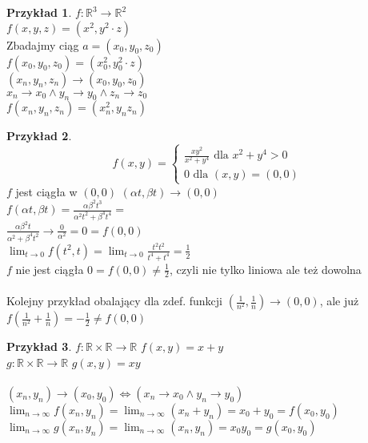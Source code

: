 \documentclass{article}
\theoremstyle{definition}
\theoremstyle{definition}
\theoremstyle{definition}
\newtheorem{pk}{Przykład}[subsection]
\theoremstyle{definition}
\begin{document}
\begin{pk}
    $f: \mathbb{R}^3 \rightarrow \mathbb{R}^2$\\
    $f(x,y,z) = (x^2,y^2\cdot z)$\\
    Zbadajmy ciąg $a=(x_0, y_0, z_0)$\\
    $f(x_0, y_0, z_0) = (x_0^2, y_0^2\cdot z)$\\
    $(x_n, y_n, z_n) \rightarrow (x_0, y_0, z_0)$\\
    $x_n\rightarrow x_0 \land y_n \rightarrow y_0 \land z_n \rightarrow z_0$\\
    $f(x_n,y_n,z_n) = (x_n^2, y_n z_n)$\\
\end{pk}

\begin{pk}
    $$f(x,y)=\begin{cases}
        \frac{xy^2}{x^2+y^4} \text{ dla } x^2 + y^4 > 0\\
        0 \text { dla } (x,y) = (0,0)
    \end{cases}$$
    $f$ jest ciągła w $(0,0)$ $(\alpha t, \beta t) \rightarrow (0,0)$\\
    $f(\alpha t, \beta t) = \frac{\alpha \beta^2 t^3}{\alpha^2 t^2 + \beta^4 t^4}=$\\
    $\frac{\alpha \beta^2 t}{\alpha^2 + \beta^4 t^2} \rightarrow \frac{0}{\alpha^2} = 0 = f(0,0)$\\
    $\lim_{t\rightarrow 0} f(t^2,t) = \lim_{t\rightarrow 0} \frac{t^2 t^2}{t^4 + t^4} = \frac{1}{2}$\\
    $f$ nie jest ciągła $0=f(0,0)\neq \frac{1}{2}$, czyli nie tylko liniowa ale też dowolna\\\\
    Kolejny przykład obalający dla zdef. funkcji $\left(\frac{1}{n^2} , \frac{1}{n}\right) \rightarrow (0,0)$, ale już\\
    $f\left(\frac{1}{n^2} + \frac{1}{n}\right) = - \frac{1}{2} \neq f(0,0)$
\end{pk}

\begin{pk}
    $f: \mathbb{R} \times \mathbb{R} \rightarrow \mathbb{R}$
    $f(x,y) = x+y$\\
    $g: \mathbb{R} \times \mathbb{R} \rightarrow \mathbb{R}$
    $g(x,y) = xy$\\\\
    $(x_n,y_n) \rightarrow (x_0, y_0) \iff (x_n\rightarrow x_0 \land y_n \rightarrow y_0)$\\
    $\lim_{n\rightarrow \infty} f(x_n, y_n) = \lim_{n\rightarrow \infty} (x_n + y_n) = x_0 + y_0 = f(x_0, y_0)$\\
    $\lim_{n\rightarrow \infty} g(x_n, y_n) = \lim_{n\rightarrow \infty} (x_n, y_n) = x_0 y_0 = g(x_0, y_0)$\\
\end{pk}
\end{document}
